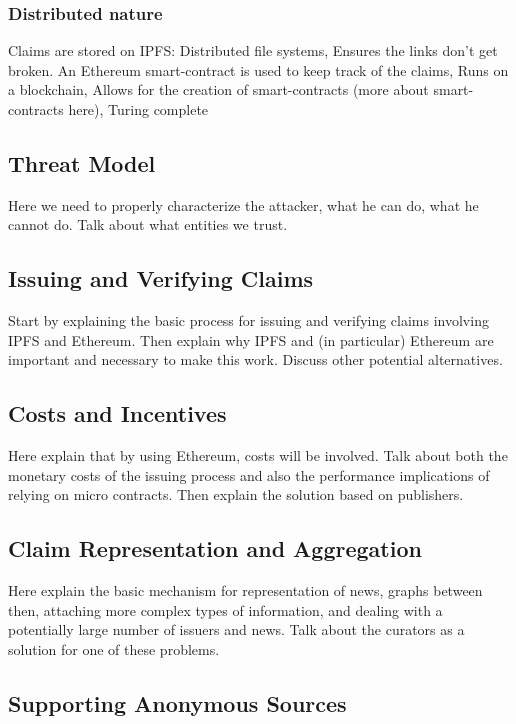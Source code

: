 \documentclass[letterpaper,twocolumn,10pt]{article}
\begin{document}
\subsubsection{Distributed nature}

Claims are stored on IPFS: Distributed file systems, Ensures the links don’t get broken.
An Ethereum smart-contract is used to keep track of the claims, Runs on a blockchain, Allows for the creation of smart-contracts (more about smart-contracts here), Turing complete


\subsection{Threat Model}

Here we need to properly characterize the attacker, what he can do, what he cannot do. Talk about what entities we trust.


\subsection{Issuing and Verifying Claims}

Start by explaining the basic process for issuing and verifying claims involving IPFS and Ethereum. Then explain why IPFS and (in particular) Ethereum are important and necessary to make this work. Discuss other potential alternatives.


\subsection{Costs and Incentives}

Here explain that by using Ethereum, costs will be involved. Talk about both the monetary costs of the issuing process and also the performance implications of relying on micro contracts. Then explain the solution based on publishers.


\subsection{Claim Representation and Aggregation}

Here explain the basic mechanism for representation of news, graphs between then, attaching more complex types of information, and dealing with a potentially large number of issuers and news. Talk about the curators as a solution for one of these problems.


\subsection{Supporting Anonymous Sources}
\end{document}
